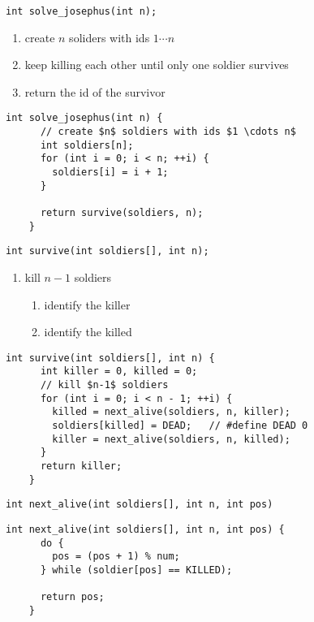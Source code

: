 \begin{frame}[fragile]{\texttt{int solve\_josephus(int n);}}

  \begin{enumerate}
    \setlength{\itemsep}{6pt}
    \item create $n$ soliders with ids $1 \cdots n$
    \item keep killing each other until only one soldier survives
    \item return the id of the survivor
  \end{enumerate}

  \vspace{0.20cm}
  \pause
  \begin{lstlisting}[style = Cstyle]
    int solve_josephus(int n) {
      // create $n$ soldiers with ids $1 \cdots n$
      int soldiers[n];
      for (int i = 0; i < n; ++i) {
        soldiers[i] = i + 1;
      }

      return survive(soldiers, n);
    }
  \end{lstlisting}
\end{frame}

\begin{frame}[fragile]{\texttt{int survive(int soldiers[], int n);}}

  \begin{enumerate}
    \item kill $n-1$ soldiers 
      \begin{enumerate}
	\item identify the killer
	\item identify the killed
      \end{enumerate}
  \end{enumerate}

  \vspace{0.20cm}
  \pause
  \begin{lstlisting}[style = Cstyle]
    int survive(int soldiers[], int n) {
      int killer = 0, killed = 0;
      // kill $n-1$ soldiers
      for (int i = 0; i < n - 1; ++i) {
        killed = next_alive(soldiers, n, killer);
        soldiers[killed] = DEAD;   // #define DEAD 0
        killer = next_alive(soldiers, n, killed);
      }
      return killer;
    }
  \end{lstlisting}
\end{frame}
\begin{frame}[fragile]{\texttt{int next\_alive(int soldiers[], int n, int pos)}}
  \begin{lstlisting}[style = Cstyle]
    int next_alive(int soldiers[], int n, int pos) {
      do {
        pos = (pos + 1) % num;
      } while (soldier[pos] == KILLED);

      return pos;
    }
  \end{lstlisting}
\end{frame}


